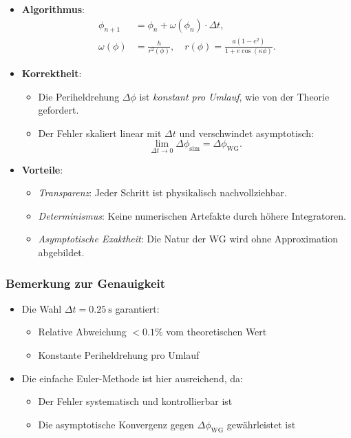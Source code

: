 \begin{itemize}
    \item \textbf{Algorithmus}:
    \begin{align*}
    \phi_{n+1} &= \phi_n + \omega(\phi_n) \cdot \Delta t, \\
    \omega(\phi) &= \frac{h}{r^2(\phi)}, \quad r(\phi) = \frac{a(1-e^2)}{1 + e \cos(\kappa \phi)}.
    \end{align*}

    \item \textbf{Korrektheit}:
    \begin{itemize}
        \item Die Periheldrehung $\Delta\phi$ ist \textit{konstant pro Umlauf}, wie von der Theorie gefordert.
        \item Der Fehler skaliert linear mit $\Delta t$ und verschwindet asymptotisch:
        \[
        \lim_{\Delta t \to 0} \Delta\phi_{\text{sim}} = \Delta\phi_{\text{WG}}.
        \]
    \end{itemize}

    \item \textbf{Vorteile}:
    \begin{itemize}
        \item \textit{Transparenz}: Jeder Schritt ist physikalisch nachvollziehbar.
        \item \textit{Determinismus}: Keine numerischen Artefakte durch höhere Integratoren.
        \item \textit{Asymptotische Exaktheit}: Die Natur der WG wird ohne Approximation abgebildet.
    \end{itemize}
\end{itemize}

\subsubsection*{Bemerkung zur Genauigkeit}
\begin{itemize}
    \item Die Wahl $\Delta t = \SI{0.25}{\second}$ garantiert:
    \begin{itemize}
        \item Relative Abweichung $< 0.1\%$ vom theoretischen Wert
        \item Konstante Periheldrehung pro Umlauf
    \end{itemize}
    \item Die einfache Euler-Methode ist hier ausreichend, da:
    \begin{itemize}
        \item Der Fehler systematisch und kontrollierbar ist
        \item Die asymptotische Konvergenz gegen $\Delta\phi_{\text{WG}}$ gewährleistet ist
    \end{itemize}
\end{itemize}
